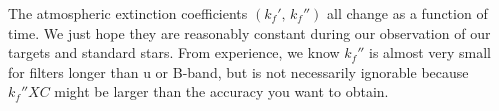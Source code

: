 

The atmospheric extinction coefficients $ (k_f',\, k_f'') $ all change as a function of time. We just hope they are reasonably constant during our observation of our targets and standard stars. From experience, we know $ k_f'' $ is almost very small for filters longer than u or B-band, but is not necessarily ignorable because $ k_f'' XC $ might be larger than the accuracy you want to obtain. 

